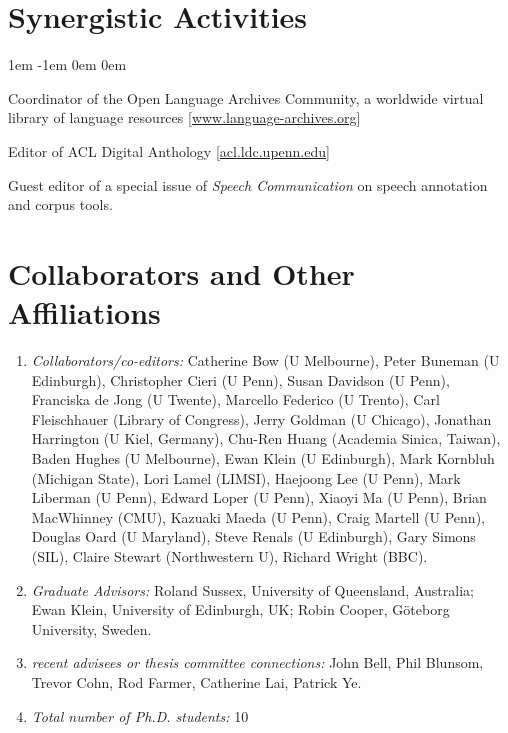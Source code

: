 \documentclass[11pt]{article}
\newenvironment{reflist}{\begin{list}{}{\leftmargin 1em \itemindent -1em
    \listparindent \itemindent \parsep 0em \itemsep 0em}}{\end{list}}
\begin{document}
\section{Synergistic Activities}

\begin{reflist}
\item
  Coordinator of the Open Language Archives Community, a worldwide virtual
  library of language resources [\url{www.language-archives.org}]
\item
  Editor of ACL Digital Anthology [\url{acl.ldc.upenn.edu}]
\item Guest editor of a special issue
  of {\it Speech Communication} on speech annotation and corpus tools.
\end{reflist}

\section{Collaborators and Other Affiliations}

\begin{enumerate}
\item \textit{Collaborators/co-editors:}
  Catherine Bow (U Melbourne),
  Peter Buneman (U Edinburgh),
  Christopher Cieri (U Penn),
  Susan Davidson (U Penn),
  Franciska de Jong (U Twente),
  Marcello Federico (U Trento),
  Carl Fleischhauer (Library of Congress),
  Jerry Goldman (U Chicago),
  Jonathan Harrington (U Kiel, Germany),
  Chu-Ren Huang (Academia Sinica, Taiwan),
  Baden Hughes (U Melbourne),
  Ewan Klein (U Edinburgh),
  Mark Kornbluh (Michigan State),
  Lori Lamel (LIMSI),
  Haejoong Lee (U Penn),
  Mark Liberman (U Penn),
  Edward Loper (U Penn),
  Xiaoyi Ma (U Penn),
  Brian MacWhinney (CMU),
  Kazuaki Maeda (U Penn),
  Craig Martell (U Penn),
  Douglas Oard (U Maryland),
  Steve Renals (U Edinburgh),
  Gary Simons (SIL),
  Claire Stewart (Northwestern U),
  Richard Wright (BBC).
\item \textit{Graduate Advisors:} 
  Roland Sussex, University of Queensland, Australia;
  Ewan Klein, University of Edinburgh, UK;
  Robin Cooper, G\"oteborg University, Sweden.
\item \textit{recent advisees or thesis committee connections:}
  John Bell,
  Phil Blunsom,
  Trevor Cohn,
  Rod Farmer,
  Catherine Lai,
  Patrick Ye.
\item \textit{Total number of Ph.D. students:} 10
\end{enumerate}
\end{document}
